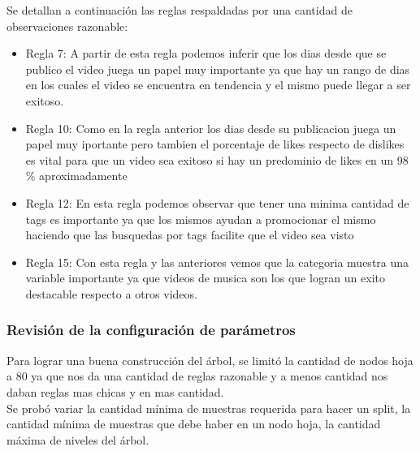             Se detallan a continuación las reglas respaldadas por una cantidad
            de observaciones razonable:
            \begin{itemize}
                \item Regla 7:
                    A partir de esta regla podemos inferir que los dias desde
                    que se publico el video juega un papel muy importante ya que
                    hay un rango de dias en los cuales el video se encuentra en
                    tendencia y el mismo puede llegar a ser exitoso.
                \item Regla 10:
                    Como en la regla anterior los dias desde su publicacion
                    juega un papel muy iportante pero tambien el porcentaje de
                    likes respecto de dislikes es vital para que un video sea
                    exitoso si hay un predominio de likes en un 98 \% aproximadamente
                \item Regla 12:
                    En esta regla podemos observar que tener una minima cantidad de
                    tags es importante ya que los mismos ayudan a promocionar el
                    mismo haciendo que las busquedas por tags facilite que el video
                    sea visto
                \item Regla 15:
                    Con esta regla y las anteriores vemos que la categoria muestra
                    una variable importante ya que videos de musica son los que logran
                    un exito destacable respecto a otros videos.
            \end{itemize}

    \subsubsection{Revisión de la configuración de parámetros}
        Para lograr una buena construcción del árbol, se limitó la cantidad de
        nodos hoja a 80 ya que nos da una cantidad de reglas razonable y a menos
        cantidad nos daban reglas mas chicas y en mas cantidad.\\
        Se probó variar la cantidad mínima de muestras requerida para hacer
        un split, la cantidad mínima de muestras que debe haber en un nodo
        hoja, la cantidad máxima de niveles del árbol.


